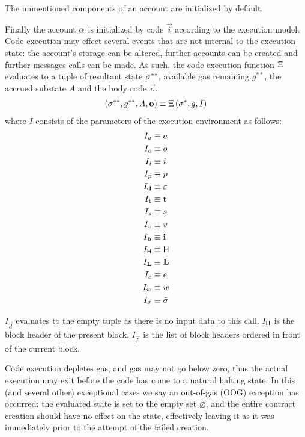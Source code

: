 The unmentioned components of an account are initialized by default.

Finally the account $\mathbf{\alpha}$ is initialized by \cvm code $\vec{i}$ according to the execution model.
Code execution may effect several events that are not internal to the execution state:
the account's storage can be altered, further accounts can be created and further messages calls can be made.
As such, the code execution function $\mathrm{\Xi}$ evaluates to a tuple of resultant state $\mathbf{\sigma}^{**}$, available gas remaining $g^{**}$, the accrued substate $A$ and the body code $\vec{o}$.
\begin{align}
	\left(\mathbf{\sigma}^{**}, g^{**},  A, \mathbf{o} \right) \equiv \mathrm{\Xi}\left(\mathbf{\sigma}^*, g, I\right)
\end{align}
where $I$ consists of the parameters of the execution environment as follows:
\begin{align}
	I_a &\equiv a\\
	I_o &\equiv o\\
	I_i &\equiv i\\
	I_p &\equiv p\\
	I_{\mathbf{d}} &\equiv \mathbb{\varepsilon}\\
	I_{\mathbf{t}} & \equiv \mathbf{t}\\
	I_s &\equiv s\\
	I_v &\equiv v\\
	I_{\mathbf{b}} &\equiv \mathbf{i}\\
	I_{\textsf{H}} & \equiv \textsf{H} \\
	I_{\mathbf{L}} & \equiv \mathbf{L} \\ 
	I_e &\equiv e\\
	I_w &\equiv w\\
	I_{\mathbf{\sigma}} & \equiv\tilde{\mathbf{\sigma}}
\end{align}

$I_{\vec{d}}$ evaluates to the empty tuple as there is no input data to this call. 
$I_{\textsf{H}}$ is the block header of the present block.
$I_\vec{L}$ is the list of block headers ordered in front of the current block.

Code execution depletes gas, and gas may not go below zero, thus the actual execution may exit before the code has come to a natural halting state.
In this (and several other) exceptional cases we say an out-of-gas (OOG) exception has occurred:
the evaluated state is set to the empty set $\varnothing$, 
and the entire contract creation should have no effect on the state, effectively leaving it as it was immediately prior to the attempt of the failed creation.


